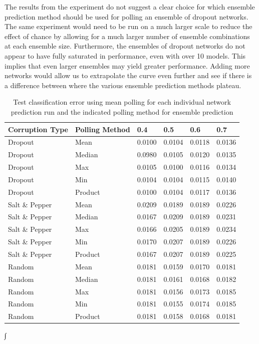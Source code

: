 \documentclass{article} %
\begin{document}
The results from the experiment do not suggest a clear choice for which ensemble prediction method should be used for polling an ensemble of dropout networks. The same experiment would need to be run on a much larger scale to reduce the effect of chance by allowing for a much larger number of ensemble combinations at each ensemble size. Furthermore, the ensembles of dropout networks do not appear to have fully saturated in performance, even with over 10 models. This implies that even larger ensembles may yield greater performance. Adding more networks would allow us to extrapolate the curve even further and see if there is a difference between where the various ensemble prediction methods plateau.

\begin{table}[ht]
\caption{Test classification error using mean polling for each individual network prediction run and the indicated polling method for ensemble prediction}
\label{tab:PollingMethods1}
\begin{center}
\begin{tabular}{| l |  l  ||| l | l | l | l |}
\hline
Corruption Type & Polling Method & 0.4 & 0.5 & 0.6 & 0.7\\
\hline
\hline
Dropout & Mean & 0.0100 & 0.0104 & 0.0118 & 0.0136 \\
\hline
Dropout & Median & 0.0980 & 0.0105 & 0.0120 & 0.0135 \\
\hline
Dropout & Max & 0.0105 & 0.0100 & 0.0116 & 0.0134 \\
\hline
Dropout & Min & 0.0104 & 0.0104 & 0.0115 & 0.0140 \\
\hline
Dropout & Product & 0.0100 & 0.0104 & 0.0117 & 0.0136 \\
\hline
\hline
Salt \& Pepper & Mean & 0.0209 & 0.0189 & 0.0189 & 0.0226 \\
\hline
Salt \& Pepper & Median & 0.0167 & 0.0209 & 0.0189 & 0.0231\\
\hline
Salt \& Pepper & Max & 0.0166 & 0.0205 & 0.0189 & 0.0234 \\
\hline
Salt \& Pepper & Min & 0.0170 & 0.0207 & 0.0189 & 0.0226 \\
\hline
Salt \& Pepper & Product & 0.0167 & 0.0207 & 0.0189 & 0.0225 \\
\hline
\hline
Random & Mean & 0.0181 & 0.0159 & 0.0170 & 0.0181 \\
\hline
Random & Median & 0.0181 & 0.0161 & 0.0168 & 0.0182 \\
\hline
Random & Max & 0.0181 & 0.0156 & 0.0173 & 0.0185 \\
\hline
Random & Min & 0.0181 & 0.0155 & 0.0174 & 0.0185 \\
\hline
Random & Product & 0.0181 & 0.0158 & 0.0168 & 0.0181 \\
\hline
\end{tabular}∫
\end{center}
\end{table}
\end{document}
